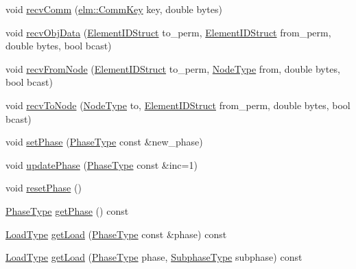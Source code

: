 \begin{DoxyCompactItemize}
\item 
void \hyperlink{structvt_1_1elm_1_1_element_l_b_data_af19f7cc95b8139b7aeec788e6450f28f}{recv\+Comm} (\hyperlink{structvt_1_1elm_1_1_comm_key}{elm\+::\+Comm\+Key} key, double bytes)
\item 
void \hyperlink{structvt_1_1elm_1_1_element_l_b_data_abe5161d28be7bccf79081ee9e8408ead}{recv\+Obj\+Data} (\hyperlink{structvt_1_1elm_1_1_element_i_d_struct}{Element\+I\+D\+Struct} to\+\_\+perm, \hyperlink{structvt_1_1elm_1_1_element_i_d_struct}{Element\+I\+D\+Struct} from\+\_\+perm, double bytes, bool bcast)
\item 
void \hyperlink{structvt_1_1elm_1_1_element_l_b_data_aadd1fa3ab5c86886b970989d05286901}{recv\+From\+Node} (\hyperlink{structvt_1_1elm_1_1_element_i_d_struct}{Element\+I\+D\+Struct} to\+\_\+perm, \hyperlink{namespacevt_a866da9d0efc19c0a1ce79e9e492f47e2}{Node\+Type} from, double bytes, bool bcast)
\item 
void \hyperlink{structvt_1_1elm_1_1_element_l_b_data_ac9fefbad98060214e8720b46a5a8aaf6}{recv\+To\+Node} (\hyperlink{namespacevt_a866da9d0efc19c0a1ce79e9e492f47e2}{Node\+Type} to, \hyperlink{structvt_1_1elm_1_1_element_i_d_struct}{Element\+I\+D\+Struct} from\+\_\+perm, double bytes, bool bcast)
\item 
void \hyperlink{structvt_1_1elm_1_1_element_l_b_data_afd6173ea281a044490a08976cb859dfc}{set\+Phase} (\hyperlink{namespacevt_a46ce6733d5cdbd735d561b7b4029f6d7}{Phase\+Type} const \&new\+\_\+phase)
\item 
void \hyperlink{structvt_1_1elm_1_1_element_l_b_data_acb64ab9bcd98f12bd5cae08ebbefd943}{update\+Phase} (\hyperlink{namespacevt_a46ce6733d5cdbd735d561b7b4029f6d7}{Phase\+Type} const \&inc=1)
\item 
void \hyperlink{structvt_1_1elm_1_1_element_l_b_data_aa6547718a29385a1600e29ae4b0792dd}{reset\+Phase} ()
\item 
\hyperlink{namespacevt_a46ce6733d5cdbd735d561b7b4029f6d7}{Phase\+Type} \hyperlink{structvt_1_1elm_1_1_element_l_b_data_ab3e11f3720c9c8ce83b23610eccbef08}{get\+Phase} () const
\item 
\hyperlink{namespacevt_a8fb51741340b87d7aaee0bef60e9896b}{Load\+Type} \hyperlink{structvt_1_1elm_1_1_element_l_b_data_a839f0515eda6316ee2d6e64bb145e1f4}{get\+Load} (\hyperlink{namespacevt_a46ce6733d5cdbd735d561b7b4029f6d7}{Phase\+Type} const \&phase) const
\item 
\hyperlink{namespacevt_a8fb51741340b87d7aaee0bef60e9896b}{Load\+Type} \hyperlink{structvt_1_1elm_1_1_element_l_b_data_abbc3c3c8a7c969b0a291f25b8e0d0a62}{get\+Load} (\hyperlink{namespacevt_a46ce6733d5cdbd735d561b7b4029f6d7}{Phase\+Type} phase, \hyperlink{namespacevt_ae78cbfdf1e57470e33eedb074f2beeba}{Subphase\+Type} subphase) const

\end{DoxyCompactItemize}

